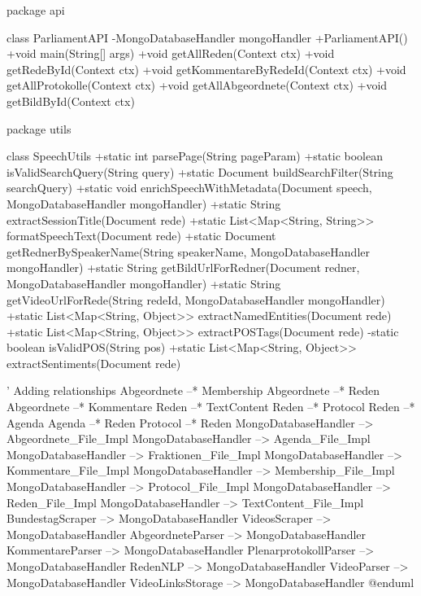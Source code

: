 package api {

  class ParliamentAPI {
    -MongoDatabaseHandler mongoHandler
    +ParliamentAPI()
    +void main(String[] args)
    +void getAllReden(Context ctx)
    +void getRedeById(Context ctx)
    +void getKommentareByRedeId(Context ctx)
    +void getAllProtokolle(Context ctx)
    +void getAllAbgeordnete(Context ctx)
    +void getBildById(Context ctx)
  }

}

package utils {

  class SpeechUtils {
    +static int parsePage(String pageParam)
    +static boolean isValidSearchQuery(String query)
    +static Document buildSearchFilter(String searchQuery)
    +static void enrichSpeechWithMetadata(Document speech, MongoDatabaseHandler mongoHandler)
    +static String extractSessionTitle(Document rede)
    +static List<Map<String, String>> formatSpeechText(Document rede)
    +static Document getRednerBySpeakerName(String speakerName, MongoDatabaseHandler mongoHandler)
    +static String getBildUrlForRedner(Document redner, MongoDatabaseHandler mongoHandler)
    +static String getVideoUrlForRede(String redeId, MongoDatabaseHandler mongoHandler)
    +static List<Map<String, Object>> extractNamedEntities(Document rede)
    +static List<Map<String, Object>> extractPOSTags(Document rede)
    -static boolean isValidPOS(String pos)
    +static List<Map<String, Object>> extractSentiments(Document rede)
  }

}

' Adding relationships
Abgeordnete --* Membership
Abgeordnete --* Reden
Abgeordnete --* Kommentare
Reden --* TextContent
Reden --* Protocol
Reden --* Agenda
Agenda --* Reden
Protocol --* Reden
MongoDatabaseHandler --> Abgeordnete_File_Impl
MongoDatabaseHandler --> Agenda_File_Impl
MongoDatabaseHandler --> Fraktionen_File_Impl
MongoDatabaseHandler --> Kommentare_File_Impl
MongoDatabaseHandler --> Membership_File_Impl
MongoDatabaseHandler --> Protocol_File_Impl
MongoDatabaseHandler --> Reden_File_Impl
MongoDatabaseHandler --> TextContent_File_Impl
BundestagScraper --> MongoDatabaseHandler
VideosScraper --> MongoDatabaseHandler
AbgeordneteParser --> MongoDatabaseHandler
KommentareParser --> MongoDatabaseHandler
PlenarprotokollParser --> MongoDatabaseHandler
RedenNLP --> MongoDatabaseHandler
VideoParser --> MongoDatabaseHandler
VideoLinksStorage --> MongoDatabaseHandler
@enduml